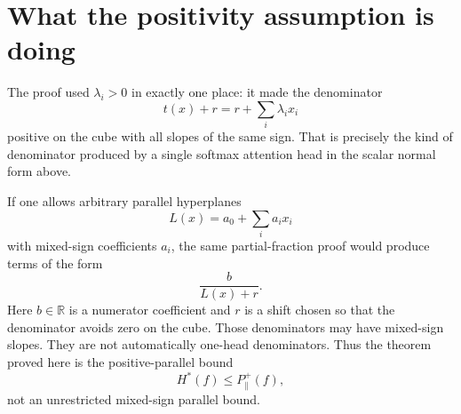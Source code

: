 \documentclass[11pt]{article}
\newcommand{\R}{\mathbb{R}}
\newcommand{\Hstar}{H^{\ast}}
\begin{document}
\section*{What the positivity assumption is doing}

The proof used $\lambda_i>0$ in exactly one place: it made the denominator
\[
t(x)+r=r+\sum_i\lambda_i x_i
\]
positive on the cube with all slopes of the same sign.  That is precisely the
kind of denominator produced by a single softmax attention head in the scalar
normal form above.

If one allows arbitrary parallel hyperplanes
\[
L(x)=a_0+\sum_i a_i x_i
\]
with mixed-sign coefficients $a_i$, the same partial-fraction proof would
produce terms of the form
\[
\frac{b}{L(x)+r}.
\]
Here $b\in\R$ is a numerator coefficient and $r$ is a shift chosen so that the
denominator avoids zero on the cube.
Those denominators may have mixed-sign slopes.  They are not automatically
one-head denominators.  Thus the theorem proved here is the positive-parallel
bound
\[
\Hstar(f)\leq P_{\parallel}^{+}(f),
\]
not an unrestricted mixed-sign parallel bound.
\end{document}
